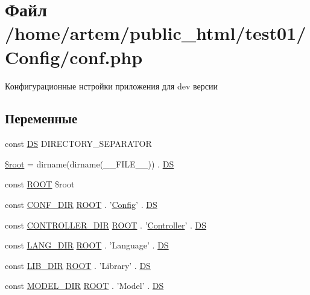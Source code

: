 \hypertarget{conf_8php}{\section{Файл /home/artem/public\-\_\-html/test01/\-Config/conf.php}
\label{conf_8php}
}


Конфигурационные нстройки приложения для dev версии  


\subsection*{Переменные}
\begin{DoxyCompactItemize}
\item 
const \hyperlink{conf_8php_ae073998f73900b8375397889044c8313}{D\-S} D\-I\-R\-E\-C\-T\-O\-R\-Y\-\_\-\-S\-E\-P\-A\-R\-A\-T\-O\-R
\item 
\hyperlink{conf_8php_ab37f7c32f41c3c61ed940887453767f4}{\$root} = dirname(dirname(\-\_\-\-\_\-\-F\-I\-L\-E\-\_\-\-\_\-)) . \hyperlink{conf___8php_ae073998f73900b8375397889044c8313}{D\-S}
\item 
const \hyperlink{conf_8php_a18c0644836e196aed6d63779e14d6bd8}{R\-O\-O\-T} \$root
\item 
const \hyperlink{conf_8php_acc332eaa302e50df333137a1642afc00}{C\-O\-N\-F\-\_\-\-D\-I\-R} \hyperlink{conf___8php_a18c0644836e196aed6d63779e14d6bd8}{R\-O\-O\-T} . '\hyperlink{class_config}{Config}' . \hyperlink{conf___8php_ae073998f73900b8375397889044c8313}{D\-S}
\item 
const \hyperlink{conf_8php_a764bb19c7c9d1c48e90b21b30e1b604a}{C\-O\-N\-T\-R\-O\-L\-L\-E\-R\-\_\-\-D\-I\-R} \hyperlink{conf___8php_a18c0644836e196aed6d63779e14d6bd8}{R\-O\-O\-T} . '\hyperlink{class_controller}{Controller}' . \hyperlink{conf___8php_ae073998f73900b8375397889044c8313}{D\-S}
\item 
const \hyperlink{conf_8php_a62485aa7dd0bdd2703aa8fb69d2ff5d8}{L\-A\-N\-G\-\_\-\-D\-I\-R} \hyperlink{conf___8php_a18c0644836e196aed6d63779e14d6bd8}{R\-O\-O\-T} . 'Language' . \hyperlink{conf___8php_ae073998f73900b8375397889044c8313}{D\-S}
\item 
const \hyperlink{conf_8php_aab9895f0433c9fc8f6980e22ddecbbd2}{L\-I\-B\-\_\-\-D\-I\-R} \hyperlink{conf___8php_a18c0644836e196aed6d63779e14d6bd8}{R\-O\-O\-T} . 'Library' . \hyperlink{conf___8php_ae073998f73900b8375397889044c8313}{D\-S}
\item 
const \hyperlink{conf_8php_af1b1241d1e4dfde50cb4cff4e42a4a06}{M\-O\-D\-E\-L\-\_\-\-D\-I\-R} \hyperlink{conf___8php_a18c0644836e196aed6d63779e14d6bd8}{R\-O\-O\-T} . 'Model' . \hyperlink{conf___8php_ae073998f73900b8375397889044c8313}{D\-S}

\end{DoxyCompactItemize}
